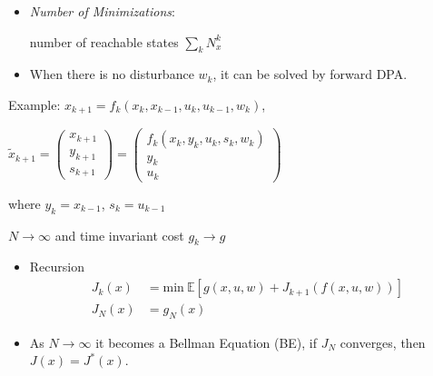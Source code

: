 \documentclass[landscape,a0paper,fontscale=0.285]{baposter} %
\newcommand{\compresslist}{ %
\setlength{\itemsep}{1pt}
\setlength{\parskip}{0pt}
\setlength{\parsep}{0pt}
}
\begin{document}
\begin{poster}
{\begin{itemize}\compresslist
  \item \textit{Number of Minimizations}:
  
  number of reachable states \(\sum_k N_x^k\)
  \item When there is no disturbance \(w_k\), it can be solved by forward DPA.
\end{itemize}


\colorbox[HTML]{CCFFFF}{}

Example: \(x_{k+1} = f_k(x_k,x_{k-1},u_k,u_{k-1},w_k)\), 

\(\tilde{x}_{k+1} = \begin{pmatrix}x_{k+1}\\y_{k+1}\\s_{k+1} \end{pmatrix}=\begin{pmatrix}f_k(x_k,y_k,u_k,s_k,w_k)\\y_k\\u_k\end{pmatrix}\) 

where \(y_k = x_{k-1}\), \(s_k = u_{k-1}\) 


\colorbox[HTML]{CCFFFF}{}
\(N \to \infty\) and time invariant cost \(g_k \to g\)
\begin{itemize}\compresslist
  \item Recursion\vspace{-0.3cm}
  $$
  \begin{aligned}
  J_k(x) &= \text{min}~\mathbb{E}\left[g(x,u,w) + J_{k+1}(f(x,u,w))\right] \\
  J_N(x) &= g_N(x)
    \end{aligned}
  $$
  \item As \(N \to \infty\) it becomes a Bellman Equation (BE), if \(J_N\) converges, then \(J(x) = J^*(x)\).
\end{itemize}

}

\end{poster}
\end{document}
